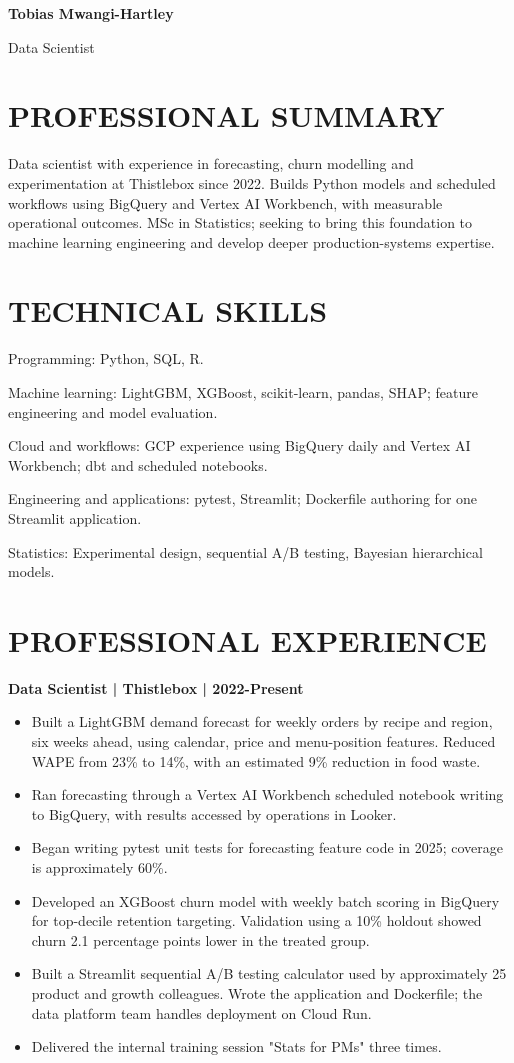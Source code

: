 \documentclass[11pt,a4paper]{article}
\newcommand{\cvsection}[1]{\section*{#1}}
\begin{document}
{\LARGE\bfseries\color{primarycolor} Tobias Mwangi-Hartley}\par
{\large\color{accentcolor} Data Scientist}\par
\cvsection{PROFESSIONAL SUMMARY}
Data scientist with experience in forecasting, churn modelling and experimentation at Thistlebox since 2022. Builds Python models and scheduled workflows using BigQuery and Vertex AI Workbench, with measurable operational outcomes. MSc in Statistics; seeking to bring this foundation to machine learning engineering and develop deeper production-systems expertise.
\cvsection{TECHNICAL SKILLS}
Programming: Python, SQL, R.\par
Machine learning: LightGBM, XGBoost, scikit-learn, pandas, SHAP; feature engineering and model evaluation.\par
Cloud and workflows: GCP experience using BigQuery daily and Vertex AI Workbench; dbt and scheduled notebooks.\par
Engineering and applications: pytest, Streamlit; Dockerfile authoring for one Streamlit application.\par
Statistics: Experimental design, sequential A/B testing, Bayesian hierarchical models.
\cvsection{PROFESSIONAL EXPERIENCE}
\textbf{Data Scientist | Thistlebox | 2022-Present}
\begin{itemize}
\item Built a LightGBM demand forecast for weekly orders by recipe and region, six weeks ahead, using calendar, price and menu-position features. Reduced WAPE from 23\% to 14\%, with an estimated 9\% reduction in food waste.
\item Ran forecasting through a Vertex AI Workbench scheduled notebook writing to BigQuery, with results accessed by operations in Looker.
\item Began writing pytest unit tests for forecasting feature code in 2025; coverage is approximately 60\%.
\item Developed an XGBoost churn model with weekly batch scoring in BigQuery for top-decile retention targeting. Validation using a 10\% holdout showed churn 2.1 percentage points lower in the treated group.
\item Built a Streamlit sequential A/B testing calculator used by approximately 25 product and growth colleagues. Wrote the application and Dockerfile; the data platform team handles deployment on Cloud Run.
\item Delivered the internal training session "Stats for PMs" three times.
\end{itemize}
\end{document}
